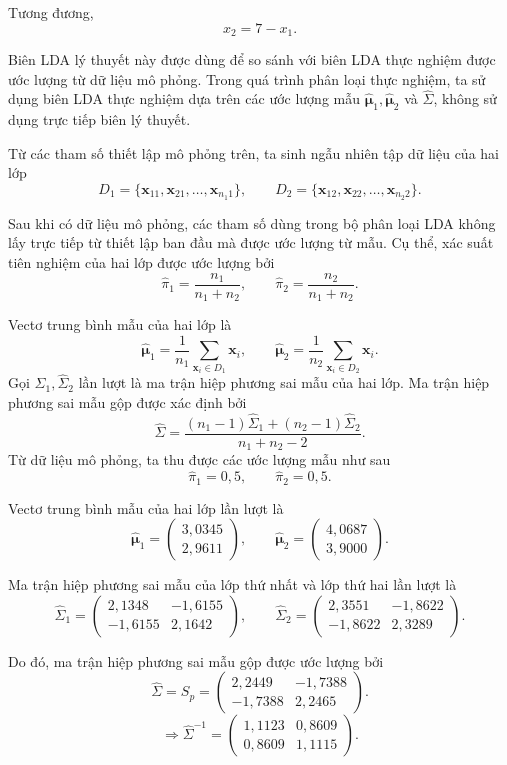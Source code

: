 Tương đương,
\[
x_2=7-x_1.
\]

Biên LDA lý thuyết này được dùng để so sánh với biên LDA thực nghiệm được ước lượng từ dữ liệu mô phỏng. Trong quá trình phân loại thực nghiệm, ta sử dụng biên LDA thực nghiệm dựa trên các ước lượng mẫu \(\hat{\bm{\mu}}_1,\hat{\bm{\mu}}_2\) và \(\hat{\Sigma}\), không sử dụng trực tiếp biên lý thuyết.

Từ các tham số thiết lập mô phỏng trên, ta sinh ngẫu nhiên tập dữ liệu của hai lớp
\[
D_1=\{\bm{x}_{11},\bm{x}_{21},\ldots,\bm{x}_{n_1 1}\},
\qquad
D_2=\{\bm{x}_{12},\bm{x}_{22},\ldots,\bm{x}_{n_2 2}\}.
\]

Sau khi có dữ liệu mô phỏng, các tham số dùng trong bộ phân loại LDA không lấy trực tiếp từ thiết lập ban đầu mà được ước lượng từ mẫu. Cụ thể, xác suất tiên nghiệm của hai lớp được ước lượng bởi
\[
\hat{\pi}_1=\frac{n_1}{n_1+n_2},
\qquad
\hat{\pi}_2=\frac{n_2}{n_1+n_2}.
\]

Vectơ trung bình mẫu của hai lớp là
\[
\hat{\bm{\mu}}_1
=
\frac{1}{n_1}
\sum_{\bm{x}_i\in D_1}
\bm{x}_i,
\qquad
\hat{\bm{\mu}}_2
=
\frac{1}{n_2}
\sum_{\bm{x}_i\in D_2}
\bm{x}_i.
\]
Gọi \(\hat{\Sigma}_1,\hat{\Sigma}_2\) lần lượt là ma trận hiệp phương sai mẫu của hai lớp. Ma trận hiệp phương sai mẫu gộp được xác định bởi \[ \hat{\Sigma} = \frac{(n_1-1)\hat{\Sigma}_1+(n_2-1)\hat{\Sigma}_2}{n_1+n_2-2}. \]
Từ dữ liệu mô phỏng, ta thu được các ước lượng mẫu như sau
\[
\hat{\pi}_1=0{,}5,
\qquad
\hat{\pi}_2=0{,}5.
\]

Vectơ trung bình mẫu của hai lớp lần lượt là
\[
\hat{\bm{\mu}}_1
=
\begin{pmatrix}
	3{,}0345\\
	2{,}9611
\end{pmatrix},
\qquad
\hat{\bm{\mu}}_2
=
\begin{pmatrix}
	4{,}0687\\
	3{,}9000
\end{pmatrix}.
\]

Ma trận hiệp phương sai mẫu của lớp thứ nhất và lớp thứ hai lần lượt là
\[
\hat{\Sigma}_1
=
\begin{pmatrix}
	2{,}1348 & -1{,}6155\\
	-1{,}6155 & 2{,}1642
\end{pmatrix},
\qquad
\hat{\Sigma}_2
=
\begin{pmatrix}
	2{,}3551 & -1{,}8622\\
	-1{,}8622 & 2{,}3289
\end{pmatrix}.
\]

Do đó, ma trận hiệp phương sai mẫu gộp được ước lượng bởi
\[
\hat{\Sigma}
=
S_p
=
\begin{pmatrix}
	2{,}2449 & -1{,}7388\\
	-1{,}7388 & 2{,}2465
\end{pmatrix}.
\]
\[
\Rightarrow
\hat{\Sigma}^{-1}
=
\begin{pmatrix}
	1{,}1123 & 0{,}8609\\
	0{,}8609 & 1{,}1115
\end{pmatrix}.
\]

